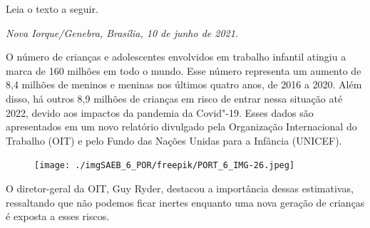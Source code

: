 

Leia o texto a seguir.

\begin{myquote}
\begin{flushright}
\emph{Nova Iorque/Genebra, Brasília, 10 de junho de 2021.} 
\end{flushright}

\medskip

\noindent O número de
crianças e adolescentes envolvidos em trabalho infantil atingiu a marca
de 160 milhões em todo o mundo. Esse número representa um aumento de 8,4
milhões de meninos e meninas nos últimos quatro anos, de 2016 a 2020.
Além disso, há outros 8,9 milhões de crianças em risco de entrar nessa
situação até 2022, devido aos impactos da pandemia da Covid"-19. Esses
dados são apresentados em um novo relatório divulgado pela Organização
Internacional do Trabalho (OIT) e pelo Fundo das Nações Unidas para a
Infância (UNICEF).

\begin{figure}[H]
\centering\texttt{[image: ./imgSAEB\_6\_POR/freepik/PORT\_6\_IMG-26.jpeg]}
\end{figure}

O diretor-geral da OIT, Guy Ryder, destacou a importância dessas
estimativas, ressaltando que não podemos ficar inertes enquanto uma nova
geração de crianças é exposta a esses riscos.

\end{myquote}

